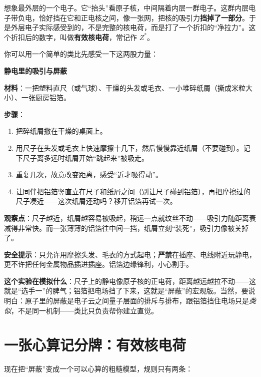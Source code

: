 想象最外层的一个电子。它“抬头”看原子核，中间隔着内层一群电子。这群内层电子带负电，恰好挡在它和正电核之间，像一张网，把核的吸引力\textbf{挡掉了一部分}。于是外层电子实际感受到的，不是完整的核电荷，而是打了一个折扣的“净拉力”。这个折扣后的数字，叫做\textbf{有效核电荷}，常记作 $Z^{*}$。

你可以用一个简单的类比先感受一下这两股力量：

\begin{shiyan}
\textbf{静电里的吸引与屏蔽}

\textbf{材料}：一把塑料直尺（或气球）、干燥的头发或毛衣、一小堆碎纸屑（撕成米粒大小）、一张厨房铝箔。

\textbf{步骤}：
\begin{enumerate}[itemsep=1pt]
\item 把碎纸屑撒在干燥的桌面上。
\item 用尺子在头发或毛衣上快速摩擦十几下，然后慢慢靠近纸屑（不要碰到）。记下尺子离多远时纸屑开始“跳起来”被吸走。
\item 重复几次，故意改变距离，感受“近才吸得动”。
\item 让同伴把铝箔竖直立在尺子和纸屑之间（别让尺子碰到铝箔），再把摩擦过的尺子凑近——这次纸屑还动吗？移开铝箔再试一次。
\end{enumerate}

\textbf{观察点}：尺子越近，纸屑越容易被吸起，稍远一点就纹丝不动——吸引力随距离衰减得非常快。而一张薄薄的铝箔往中间一挡，纸屑立刻“装死”，吸引力像被关掉了。

\textbf{安全提示}：只允许用摩擦头发、毛衣的方式起电；\textbf{严禁}在插座、电线附近玩静电，更不许把任何金属物品插进插座。铝箔边缘锋利，小心割手。

\textbf{这个实验在模拟什么}：尺子上的静电像原子核的正电荷，距离越远越拉不动——这就是“选手一”的脾气；铝箔把电场挡了下来，这就是“屏蔽”的宏观版。当然，要说明白：原子里的屏蔽是电子云之间量子层面的排斥与排布，跟铝箔挡住电场只是\emph{类似}，不是同一机制——类比只负责帮你建立直觉。
\end{shiyan}

\section{一张心算记分牌：有效核电荷}

现在把“屏蔽”变成一个可以心算的粗糙模型，规则只有两条：

